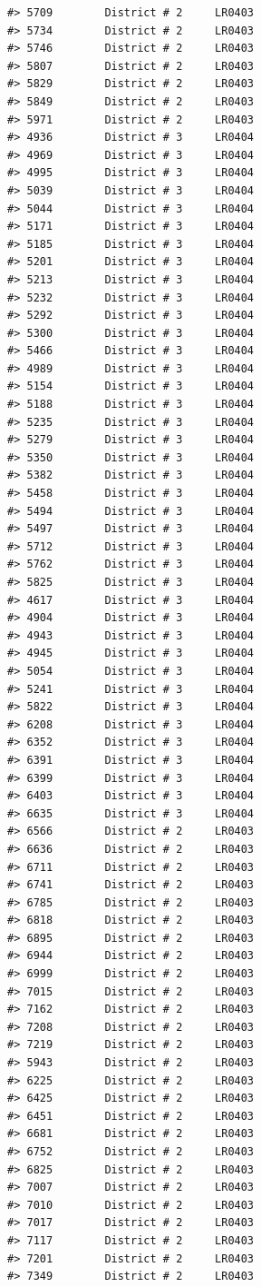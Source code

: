 \documentclass[12pt,a4paper]{book}
\theoremstyle{definition}
\theoremstyle{definition}
\theoremstyle{definition}
\theoremstyle{remark}
\begin{document}
\begin{verbatim}
#> 5709        District # 2     LR0403
#> 5734        District # 2     LR0403
#> 5746        District # 2     LR0403
#> 5807        District # 2     LR0403
#> 5829        District # 2     LR0403
#> 5849        District # 2     LR0403
#> 5971        District # 2     LR0403
#> 4936        District # 3     LR0404
#> 4969        District # 3     LR0404
#> 4995        District # 3     LR0404
#> 5039        District # 3     LR0404
#> 5044        District # 3     LR0404
#> 5171        District # 3     LR0404
#> 5185        District # 3     LR0404
#> 5201        District # 3     LR0404
#> 5213        District # 3     LR0404
#> 5232        District # 3     LR0404
#> 5292        District # 3     LR0404
#> 5300        District # 3     LR0404
#> 5466        District # 3     LR0404
#> 4989        District # 3     LR0404
#> 5154        District # 3     LR0404
#> 5188        District # 3     LR0404
#> 5235        District # 3     LR0404
#> 5279        District # 3     LR0404
#> 5350        District # 3     LR0404
#> 5382        District # 3     LR0404
#> 5458        District # 3     LR0404
#> 5494        District # 3     LR0404
#> 5497        District # 3     LR0404
#> 5712        District # 3     LR0404
#> 5762        District # 3     LR0404
#> 5825        District # 3     LR0404
#> 4617        District # 3     LR0404
#> 4904        District # 3     LR0404
#> 4943        District # 3     LR0404
#> 4945        District # 3     LR0404
#> 5054        District # 3     LR0404
#> 5241        District # 3     LR0404
#> 5822        District # 3     LR0404
#> 6208        District # 3     LR0404
#> 6352        District # 3     LR0404
#> 6391        District # 3     LR0404
#> 6399        District # 3     LR0404
#> 6403        District # 3     LR0404
#> 6635        District # 3     LR0404
#> 6566        District # 2     LR0403
#> 6636        District # 2     LR0403
#> 6711        District # 2     LR0403
#> 6741        District # 2     LR0403
#> 6785        District # 2     LR0403
#> 6818        District # 2     LR0403
#> 6895        District # 2     LR0403
#> 6944        District # 2     LR0403
#> 6999        District # 2     LR0403
#> 7015        District # 2     LR0403
#> 7162        District # 2     LR0403
#> 7208        District # 2     LR0403
#> 7219        District # 2     LR0403
#> 5943        District # 2     LR0403
#> 6225        District # 2     LR0403
#> 6425        District # 2     LR0403
#> 6451        District # 2     LR0403
#> 6681        District # 2     LR0403
#> 6752        District # 2     LR0403
#> 6825        District # 2     LR0403
#> 7007        District # 2     LR0403
#> 7010        District # 2     LR0403
#> 7017        District # 2     LR0403
#> 7117        District # 2     LR0403
#> 7201        District # 2     LR0403
#> 7349        District # 2     LR0403
\end{verbatim}
\end{document}
